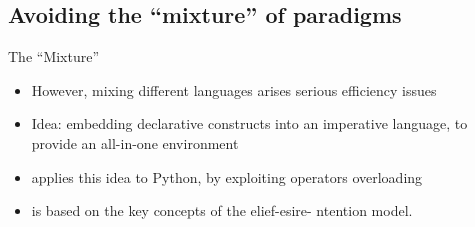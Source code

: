 \subsection{Avoiding the ``mixture'' of paradigms}
\begin{frame}[label=2]{The ``Mixture''}
  \begin{itemize}

    \item
      However, mixing different languages arises serious efficiency issues
\N
    \item
      Idea: embedding declarative constructs into an imperative language,
      to provide an all-in-one environment
\N\N
    \item 
       applies this idea to Python, by exploiting operators 
      overloading
\N
    \item
       is based on the key concepts of the 
      elief-esire- ntention model.
 
    \end{itemize}
\N\N
\end{frame}
%
%
%
%
%
%
%
%
%
%
%
